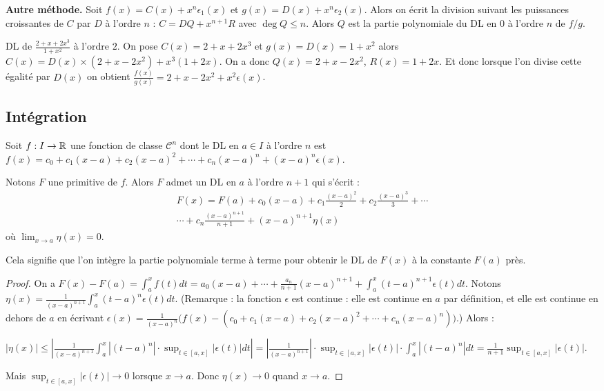 \documentclass[class=report,crop=false]{standalone}
\begin{document}
\textbf{Autre méthode.}
Soit
$f(x)=C(x) + x^n\epsilon_1(x)$ et $g(x)=D(x) + x^n\epsilon_2(x)$.
Alors on écrit la division suivant les puissances croissantes de
$C$ par $D$ à l'ordre $n$ : $C=DQ+ x^{n+1}R$ avec $\deg Q \le n$.
Alors $Q$ est la partie polynomiale du DL en $0$ à l'ordre $n$ de $f/g$.

\begin{exemple}
DL de $\frac{2+x+2x^3}{1+x^2}$ à l'ordre $2$.
On pose $C(x)=2+x+2x^3$ et $g(x)=D(x)=1+x^2$ alors
$C(x)=D(x)\times (2+x-2x^2) + x^3(1+2x)$. On a donc $Q(x)=2+x-2x^2$,
$R(x) = 1+2x$. Et donc lorsque l'on divise cette égalité par $D(x)$ on obtient
$\frac{f(x)}{g(x)}=2+x-2x^2 + x^2\epsilon(x)$.
\end{exemple}


\subsection{Intégration}

Soit $f : I\to \mathbb{R}$ une fonction de classe $\mathcal{C}^n$ dont le DL
en $a\in I$ à l'ordre $n$ est $f(x)=c_0+c_1(x-a)+c_2(x-a)^2+\cdots+c_n(x-a)^n+(x-a)^n\epsilon(x)$.
\begin{theoreme}
Notons $F$ une primitive de $f$.
Alors $F$ admet un DL en $a$ à l'ordre $n+1$ qui s'écrit :
\begin{multline*}
F(x)=F(a)+c_0(x-a)+c_1\frac{(x-a)^2}{2}+ c_2\frac{(x-a)^3}{3}+\cdots \\
\cdots +c_n\frac{(x-a)^{n+1}}{n+1}+(x-a)^{n+1}\eta(x)  
\end{multline*}
où $\displaystyle\lim_{x\to a}\eta(x)=0$.
\end{theoreme}

Cela signifie que l'on intègre la partie polynomiale terme à terme pour obtenir le DL de $F(x)$ à la constante $F(a)$ près.

\begin{proof}
On a $F(x)-F(a)=\int_a^xf(t)dt
=a_0(x-a)+\cdots+\frac{a_n}{n+1}(x-a)^{n+1}+\int_a^x(t-a)^{n+1}
\epsilon(t)dt$.
Notons $\eta(x)=\frac{1}{(x-a)^{n+1}}\int_a^x(t-a)^{n}\epsilon(t)dt$.
(Remarque : la fonction $\epsilon$ est continue : elle est continue en $a$ par définition,  
et elle est continue en dehors de $a$ en écrivant 
$\epsilon(x) = \frac{1}{(x-a)^n}\big(f(x)-(c_0+c_1(x-a)+c_2(x-a)^2+\cdots+c_n(x-a)^n)\big)$.)
Alors :

$|\eta(x)|
  \le \left|\frac{1}{(x-a)^{n+1}} \int_a^x|(t-a)^{n}| \cdot \sup_{t\in[a,x]}|\epsilon(t)|dt\right|
=\left|\frac{1}{(x-a)^{n+1}}\right| \cdot \sup_{t\in[a,x]}|\epsilon(t)| \cdot \int_a^x|(t-a)^{n}| dt
=\frac{1}{n+1}\sup_{t\in[a,x]}|\epsilon(t)|$.

Mais $\sup_{t\in[a,x]}|\epsilon(t)| \to 0$ lorsque $x\to a$. Donc $\eta(x)\to 0$ quand $x\to a$.

\end{proof}
\end{document}

